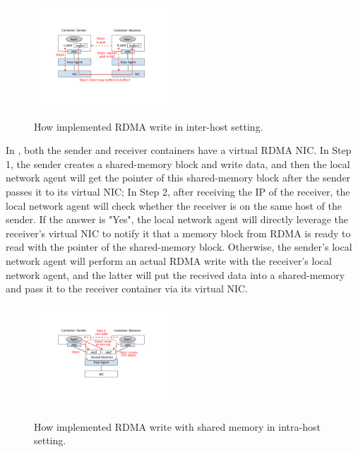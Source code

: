      \begin{figure}[ht]
     \centering 
     \includegraphics[width=0.45\textwidth]{figures/system/sys_rdma_rdma.pdf}      
     \label{fig:sys_rdma_rdma}
     \caption{How \sysname implemented RDMA write in inter-host setting.} 
     \end{figure}

In \sysname, both the sender and receiver containers have a virtual RDMA NIC.
In Step 1, the sender creates a shared-memory block and write data, and then 
the local network agent will get the pointer of this shared-memory block after the sender passes it to its virtual NIC; In Step 2, after receiving the IP of 
the receiver, the local network agent will check whether the receiver is on
the same host of the sender. If the answer is "Yes", the local network agent will
directly leverage the receiver's virtual NIC to notify it that a memory block 
from RDMA is ready to read with the pointer of the shared-memory block. 
Otherwise, the sender's local network agent will perform an actual RDMA write
with the receiver's local network agent, and the latter will put the received data into a shared-memory and pass it to the receiver container via its virtual NIC.
     
     \begin{figure}[ht]
     \centering 
     \includegraphics[width=0.45\textwidth]{figures/system/sys_rdma_shm.pdf}      
     \label{fig:sys_rdma_shm}
     \caption{How \sysname implemented RDMA write with shared memory in intra-host setting.} 
     \end{figure}
     
